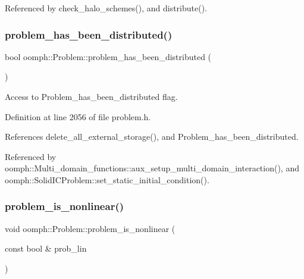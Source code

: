 Referenced by check\+\_\+halo\+\_\+schemes(), and distribute().

\mbox{\label{classoomph_1_1Problem_aa44439175e6899a1a6c125f08b786301}} 
\subsubsection{\texorpdfstring{problem\+\_\+has\+\_\+been\+\_\+distributed()}{problem\_has\_been\_distributed()}}
{\footnotesize\ttfamily bool oomph\+::\+Problem\+::problem\+\_\+has\+\_\+been\+\_\+distributed (\begin{DoxyParamCaption}{ }\end{DoxyParamCaption})\hspace{0.3cm}{\ttfamily [inline]}}



Access to Problem\+\_\+has\+\_\+been\+\_\+distributed flag. 



Definition at line 2056 of file problem.\+h.



References delete\+\_\+all\+\_\+external\+\_\+storage(), and Problem\+\_\+has\+\_\+been\+\_\+distributed.



Referenced by oomph\+::\+Multi\+\_\+domain\+\_\+functions\+::aux\+\_\+setup\+\_\+multi\+\_\+domain\+\_\+interaction(), and oomph\+::\+Solid\+I\+C\+Problem\+::set\+\_\+static\+\_\+initial\+\_\+condition().

\mbox{\label{classoomph_1_1Problem_a92acc3c193a38f321fc318fafd142f7a}} 
\subsubsection{\texorpdfstring{problem\+\_\+is\+\_\+nonlinear()}{problem\_is\_nonlinear()}}
{\footnotesize\ttfamily void oomph\+::\+Problem\+::problem\+\_\+is\+\_\+nonlinear (\begin{DoxyParamCaption}\item[{const bool \&}]{prob\+\_\+lin }\end{DoxyParamCaption})\hspace{0.3cm}{\ttfamily [inline]}}



